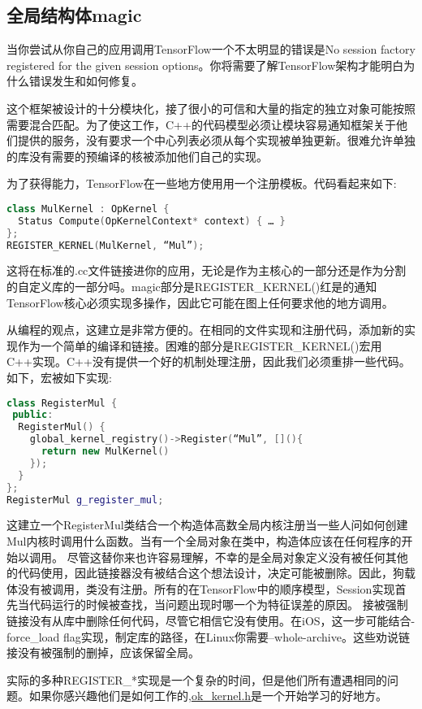 \subsection{全局结构体magic}
当你尝试从你自己的应用调用TensorFlow一个不太明显的错误是No session factory registered for the given session options。你将需要了解TensorFlow架构才能明白为什么错误发生和如何修复。

这个框架被设计的十分模块化，接了很小的可信和大量的指定的独立对象可能按照需要混合匹配。为了使这工作，C++的代码模型必须让模块容易通知框架关于他们提供的服务，没有要求一个中心列表必须从每个实现被单独更新。很难允许单独的库没有需要的预编译的核被添加他们自己的实现。

为了获得能力，TensorFlow在一些地方使用用一个注册模板。代码看起来如下:
\begin{lstlisting}[language=C++]
class MulKernel : OpKernel {
  Status Compute(OpKernelContext* context) { … }
};
REGISTER_KERNEL(MulKernel, “Mul”);
\end{lstlisting}
这将在标准的.cc文件链接进你的应用，无论是作为主核心的一部分还是作为分割的自定义库的一部分吗。magic部分是REGISTER\_KERNEL()红是的通知TensorFlow核心必须实现多操作，因此它可能在图上任何要求他的地方调用。

从编程的观点，这建立是非常方便的。在相同的文件实现和注册代码，添加新的实现作为一个简单的编译和链接。困难的部分是REGISTER\_KERNEL()宏用C++实现。C++没有提供一个好的机制处理注册，因此我们必须重排一些代码。如下，宏被如下实现:
\begin{lstlisting}[language=C++]
class RegisterMul {
 public:
  RegisterMul() {
    global_kernel_registry()->Register(“Mul”, [](){
      return new MulKernel()
    });
  }
};
RegisterMul g_register_mul;
\end{lstlisting}
这建立一个RegisterMul类结合一个构造体高数全局内核注册当一些人问如何创建Mul内核时调用什么函数。当有一个全局对象在类中，构造体应该在任何程序的开始以调用。
尽管这替你来也许容易理解，不幸的是全局对象定义没有被任何其他的代码使用，因此链接器没有被结合这个想法设计，决定可能被删除。因此，狗载体没有被调用，类没有注册。所有的在TensorFlow中的顺序模型，Session实现首先当代码运行的时候被查找，当问题出现时哪一个为特征误差的原因。
接被强制链接没有从库中删除任何代码，尽管它相信它没有使用。在iOS，这一步可能结合-force\_load flag实现，制定库的路径，在Linux你需要--whole-archive。这些劝说链接没有被强制的删掉，应该保留全局。

实际的多种REGISTER\_*实现是一个复杂的时间，但是他们所有遭遇相同的问题。如果你感兴趣他们是如何工作的,\href{https://github.com/tensorflow/tensorflow/blob/master/tensorflow/core/framework/op_kernel.h#L1091}{ok\_kernel.h}是一个开始学习的好地方。
